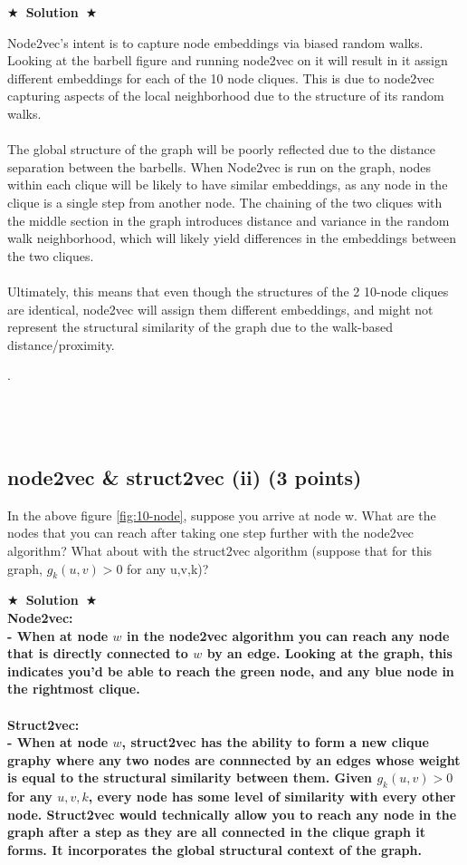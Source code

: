\documentclass{article}
\numberwithin{figure}{section}
\newcommand{\Solution}[1]{{\medskip \color{red} \bf $\bigstar$~\sf \textbf{Solution}~$\bigstar$ \sf #1 } \bigskip}
\begin{document}
\Solution{

Node2vec's intent is to capture node embeddings via biased random walks. Looking at the barbell figure and running node2vec on it will result in it assign different embeddings for each of the 10 node cliques. This is due to node2vec capturing aspects of the local neighborhood due to the structure of its random walks.\\\\ The global structure of the graph will be poorly reflected due to the distance separation between the barbells. When Node2vec is run on the graph, nodes within each clique will be likely to have similar embeddings, as any node in the clique is a single step from another node. The chaining of the two cliques with the middle section in the graph introduces distance and variance in the random walk neighborhood, which will likely yield differences in the embeddings between the two cliques. \\\\Ultimately, this means that even though the structures of the 2 10-node cliques are identical, node2vec will assign them different embeddings, and might not represent the structural similarity of the graph due to the walk-based distance/proximity.

}

.\\\\\\\\
\subsection{ node2vec \& struct2vec (ii) (3 points)}
In the above figure \ref{fig:10-node}, suppose you arrive at node w. What are the nodes that you can reach after taking one step further with the node2vec algorithm? What about with the struct2vec algorithm (suppose that for this graph, $g_k(u, v) > 0$ for any u,v,k)?

\Solution{
\\
Node2vec:\\
- When at node $w$ in the node2vec algorithm you can reach any node that is directly connected to $w$ by an edge. Looking at the graph, this indicates you'd be able to reach the green node, and any blue node in the rightmost clique.\\\\
Struct2vec:\\
- When at node $w$, struct2vec has the ability to form a new clique graphy where any two nodes are connnected by an edges whose weight is equal to the structural similarity between them. Given $g_k(u,v) > 0$ for any $u,v,k$, every node has some level of similarity with every other node. Struct2vec would technically allow you to reach any node in the graph after a step as they are all connected in the clique graph it forms. It incorporates the global structural context of the graph.

}
\end{document}
